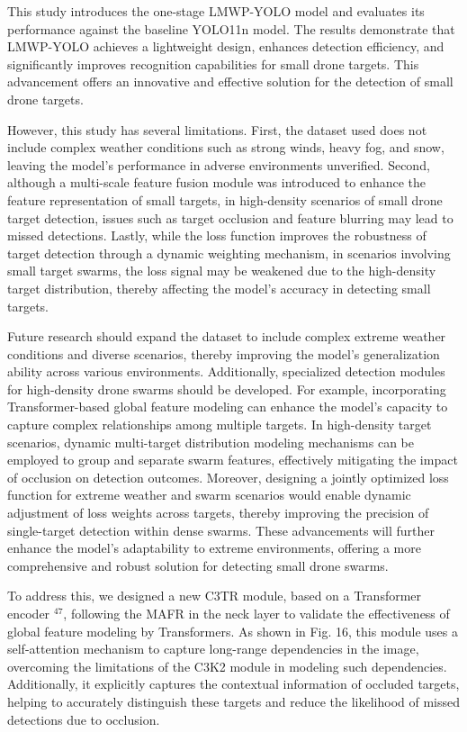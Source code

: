 \documentclass{article}
\begin{document}
This study introduces the one-stage LMWP-YOLO model and evaluates its performance against the baseline YOLO11n model. The results demonstrate that LMWP-YOLO achieves a lightweight design, enhances detection efficiency, and significantly improves recognition capabilities for small drone targets. This advancement offers an innovative and effective solution for the detection of small drone targets.

However, this study has several limitations. First, the dataset used does not include complex weather conditions such as strong winds, heavy fog, and snow, leaving the model's performance in adverse environments unverified. Second, although a multi-scale feature fusion module was introduced to enhance the feature representation of small targets, in high-density scenarios of small drone target detection, issues such as target occlusion and feature blurring may lead to missed detections. Lastly, while the loss function improves the robustness of target detection through a dynamic weighting mechanism, in scenarios involving small target swarms, the loss signal may be weakened due to the high-density target distribution, thereby affecting the model's accuracy in detecting small targets.

Future research should expand the dataset to include complex extreme weather conditions and diverse scenarios, thereby improving the model's generalization ability across various environments. Additionally, specialized detection modules for high-density drone swarms should be developed. For example, incorporating Transformer-based global feature modeling can enhance the model's capacity to capture complex relationships among multiple targets. In high-density target scenarios, dynamic multi-target distribution modeling mechanisms can be employed to group and separate swarm features, effectively mitigating the impact of occlusion on detection outcomes. Moreover, designing a jointly optimized loss function for extreme weather and swarm scenarios would enable dynamic adjustment of loss weights across targets, thereby improving the precision of single-target detection within dense swarms. These advancements will further enhance the model's adaptability to extreme environments, offering a more comprehensive and robust solution for detecting small drone swarms.

To address this, we designed a new C3TR module, based on a Transformer encoder ${ }^{47}$, following the MAFR in the neck layer to validate the effectiveness of global feature modeling by Transformers. As shown in Fig. 16, this module uses a self-attention mechanism to capture long-range dependencies in the image, overcoming the limitations of the C3K2 module in modeling such dependencies. Additionally, it explicitly captures the contextual information of occluded targets, helping to accurately distinguish these targets and reduce the likelihood of missed detections due to occlusion.
\end{document}
